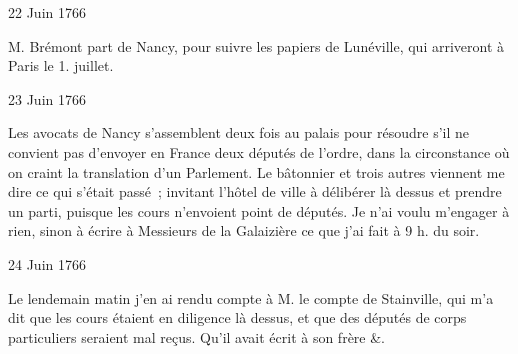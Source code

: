                     \begin{diary}{22 Juin 1766}{}
                        
                        
                           M. Brémont part de Nancy, pour suivre les
                           papiers de Lunéville, qui
                           arriveront à Paris
                           le 1.
                           juillet. \bigskip
        
        
                     \end{diary}

                     \begin{diary}{23 Juin 1766}{}
                        
                         Les avocats de Nancy s'assemblent deux fois au
                           palais pour résoudre s'il
                           ne convient pas d'envoyer
                           en France deux députés de
                              l'ordre, dans la
                           circonstance où on craint la translation d'un
                           Parlement. Le bâtonnier et
                           trois autres viennent
                           me dire ce qui s'était passé ; invitant l'hôtel
                              de ville à délibérer là dessus et prendre un
                           parti, puisque les cours n'envoient point de
                           députés. Je n'ai voulu m'engager à rien,
                           sinon à écrire à Messieurs
                           de la Galaizière ce que
                           j'ai fait à 9 h. du soir. \bigskip
        
        
                     \end{diary}
                     \begin{diary}{24 Juin 1766}{}
                        
                         Le lendemain matin j'en ai rendu
                           compte
                           à M. le compte de
                              Stainville,
                           qui m'a dit
                           que les cours étaient en diligence là dessus,
                           et que des députés de corps particuliers
                           seraient mal reçus. Qu'il avait écrit à son frère &. \bigskip
        
        
                     \end{diary}
                     
